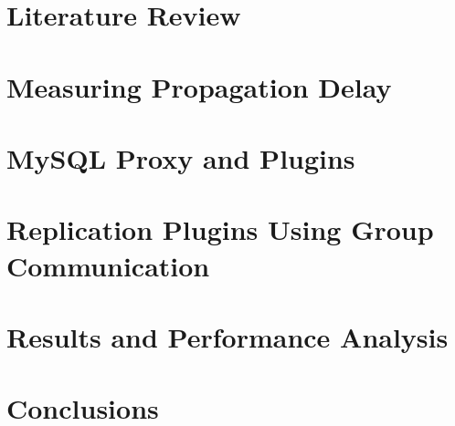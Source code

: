 \documentclass[11pt,a4paper,twoside]{book} %
\begin{document}
    \chapter{Literature Review}
        
		\mbox{}
	\chapter{Measuring Propagation Delay}
		\mbox{}
	\chapter{MySQL Proxy and Plugins}
		\mbox{}
	\chapter{Replication Plugins Using Group Communication}
		\mbox{}
	\chapter{Results and Performance Analysis}
		\thispagestyle{plain}
		\mbox{}
   \chapter{Conclusions}
   	\newpage
   	\thispagestyle{plain}
   	\mbox{}

	
	
	\appendix
%			
			
%			
\end{document}
